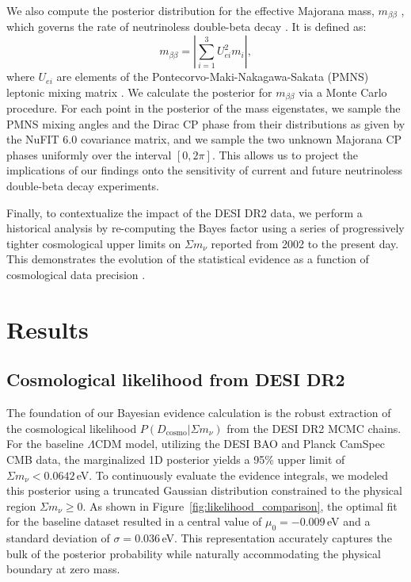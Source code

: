 \documentclass[]{article}
\begin{document}
We also compute the posterior distribution for the effective Majorana mass, $m_{\beta\beta}$ \citep{benato2015effectivemajoranamassneutrinoless}, which governs the rate of neutrinoless double-beta decay \citep{chakraborty2025highlypredictiveneutrinomodel}. It is defined as:
\begin{equation}m_{\beta\beta} = \left| \sum_{i=1}^{3} U_{ei}^2 m_i \right|,\end{equation}
where $U_{ei}$ are elements of the Pontecorvo-Maki-Nakagawa-Sakata (PMNS) leptonic mixing matrix \citep{savla2025classicalreconstructionpmnsmatrix}. We calculate the posterior for $m_{\beta\beta}$ via a Monte Carlo procedure. For each point in the posterior of the mass eigenstates, we sample the PMNS mixing angles and the Dirac CP phase from their distributions as given by the NuFIT 6.0 covariance matrix, and we sample the two unknown Majorana CP phases uniformly over the interval $[0, 2\pi]$. This allows us to project the implications of our findings onto the sensitivity of current and future neutrinoless double-beta decay experiments.

Finally, to contextualize the impact of the DESI DR2 data, we perform a historical analysis by re-computing the Bayes factor using a series of progressively tighter cosmological upper limits on $\Sigma m_\nu$ reported from 2002 to the present day. This demonstrates the evolution of the statistical evidence as a function of cosmological data precision \citep{ong2026bayesianviewdesidr2}.

\section{Results}
\label{sec:results}
\subsection{Cosmological likelihood from DESI DR2}
The foundation of our Bayesian evidence calculation is the robust extraction of the cosmological likelihood $P(D_{\text{cosmo}} | \Sigma m_\nu)$ from the DESI DR2 MCMC chains. For the baseline $\Lambda$CDM model, utilizing the DESI BAO and Planck CamSpec CMB data, the marginalized 1D posterior yields a 95\% upper limit of $\Sigma m_\nu < 0.0642$\,eV. To continuously evaluate the evidence integrals, we modeled this posterior using a truncated Gaussian distribution constrained to the physical region $\Sigma m_\nu \geq 0$. As shown in Figure~\ref{fig:likelihood_comparison}, the optimal fit for the baseline dataset resulted in a central value of $\mu_0 = -0.009$\,eV and a standard deviation of $\sigma = 0.036$\,eV. This representation accurately captures the bulk of the posterior probability while naturally accommodating the physical boundary at zero mass.
\end{document}
